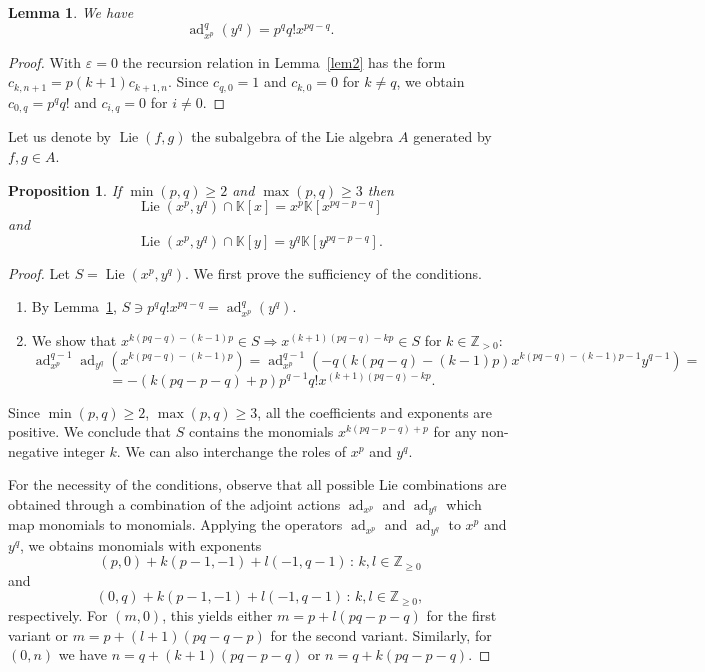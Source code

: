 \documentclass[a4paper,draft,reqno,12pt]{amsart}
\newtheorem{proposition}[theorem]{Proposition}
\newtheorem{lemma}[theorem]{Lemma}
\theoremstyle{definition}
\theoremstyle{remark}
\DeclareMathOperator{\lie}{Lie}
\DeclareMathOperator{\adj}{ad}
\def\KK{{\mathbb K}}
\def\ZZ{{\mathbb Z}}
\renewcommand{\ge}{\geqslant}
\begin{document}
\begin{lemma} \label{lem4} 
We have
$$
\adj_{x^p}^{q}(y^q) = p^q q! x^{pq - q}. 
$$
\end{lemma}

\begin{proof}
With $\varepsilon = 0$ the recursion relation in Lemma~\ref{lem2} has the form $c_{k, n+1} = p (k+1) c_{k+1,n}$. Since $c_{q,0} = 1$ and $c_{k,0} = 0$ for $k \neq q$,
we obtain $c_{0,q}=  p^q q!$ and $c_{i,q}=0$ for $i\ne 0$. 
\end{proof}

Let us denote by $\lie(f,g)$ the subalgebra of the Lie algebra $A$ generated by $f,g\in A$. 

\begin{proposition}
\label{prop-gapalgebra}
If $\min(p,q) \geq 2$ and $\max(p,q) \geq 3$ then 
$$
\lie(x^p, y^q) \cap \KK[x] = x^{p} \KK[x^{pq - p - q}]
$$
and
$$
\lie(x^p, y^q) \cap \KK[y] = y^{q} \KK[y^{pq - p - q}].
$$
\end{proposition}

\begin{proof}
Let $S = \lie(x^p, y^q)$. 
We first prove the sufficiency of the conditions. 
\smallskip
\begin{enumerate}
\item By Lemma~\ref{lem4},  $S \ni p^q q! x^{pq-q} = \adj_{x^p}^{q}(y^q)$.
\smallskip
\item We show that $x^{k(pq-q)-(k-1)p} \in S \Longrightarrow x^{(k+1)(pq-q)-kp} \in S$ for $k \in \ZZ_{>0}$:
\smallskip
$$
\adj_{x^p}^{q-1}\adj_{y^q} (x^{k(pq-q)-(k-1)p}) = \adj_{x^p}^{q-1}(-q(k(pq-q)-(k-1)p) x^{k(pq-q)-(k-1)p-1} y^{q-1}) =
$$
$$
= -(k(pq-p-q)+p) p^{q-1} q! x^{(k+1)(pq-q)-kp}. 
$$
\end{enumerate}
Since $\min(p,q) \geq 2$, $\max(p,q) \geq 3$, all the coefficients and exponents are positive.
We conclude that $S$ contains the monomials $x^{k(pq-p-q) + p}$ for any non-negative integer $k$. 
We can also interchange the roles of $x^p$ and $y^q$.

For the necessity of the conditions, observe that all possible Lie combinations are obtained through a combination of the adjoint actions $\adj_{x^p}$ and $\adj_{y^q}$ which map monomials to monomials. Applying the operators $\adj_{x^p}$ and $\adj_{y^q}$ to $x^p$ and $y^q$, we obtains monomials with exponents  
$$
(p,0) + k (p-1,-1) + l (-1,q-1) \,:\, k, l \in \ZZ_{\ge 0} 
$$
and
$$
(0,q) +  k (p-1,-1) + l (-1,q-1) \,:\, k, l \in \ZZ_{\ge 0}, 
$$
respectively.  For $(m,0)$, this yields either $m = p + l (pq-p-q)$ for the first variant or $m = p + (l + 1)(pq-q-p)$ for the second variant. 
Similarly, for $(0,n)$ we have ${n = q + (k+1)(pq-p-q)}$ or $n = q + k (pq-p-q)$. 
\end{proof}
\end{document}
